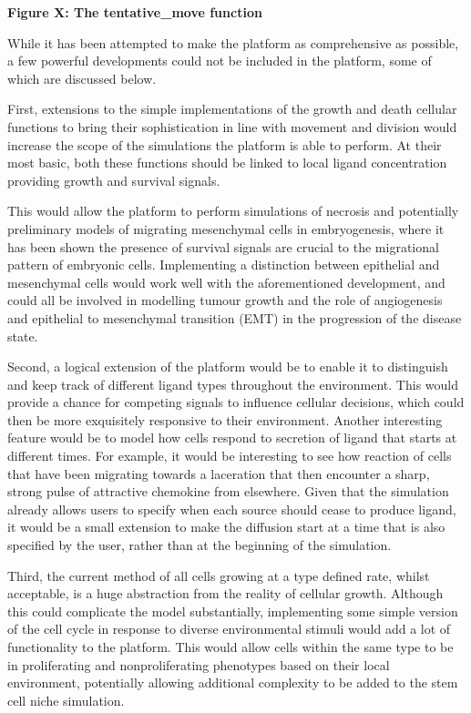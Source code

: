 \documentclass[11.5pt]{article}
\begin{document}
{\bfseries Figure X: The tentative\_move function}



While it has been attempted to make the platform as comprehensive as 
possible, a few powerful developments could not be included in the 
platform, some of which are discussed below. 



First, extensions to the simple implementations of the growth and death 
cellular functions to bring their sophistication in line with movement 
and division would increase the scope of the simulations the platform is 
able to perform. At their most basic, both these functions should be 
linked to local ligand concentration providing growth and survival 
signals. 



This would allow the platform to perform simulations of necrosis and 
potentially preliminary models of migrating mesenchymal cells in 
embryogenesis, where it has been shown the presence of survival signals 
are crucial to the migrational pattern of embryonic cells. Implementing 
a distinction between epithelial and mesenchymal cells would work well 
with the aforementioned development, and could all be involved in 
modelling tumour growth and the role of angiogenesis and epithelial to 
mesenchymal transition (EMT) in the progression of the disease state.



Second, a logical extension of the platform would be to enable it to 
distinguish and keep track of different ligand types throughout the 
environment. This would provide a chance for competing signals to 
influence cellular decisions, which could then be more exquisitely 
responsive to their environment. Another interesting feature would be to 
model how cells respond to secretion of ligand that starts at different 
times. For example, it would be interesting to see how reaction of cells 
that have been migrating towards a laceration that then encounter a 
sharp, strong pulse of attractive chemokine from elsewhere. Given that 
the simulation already allows users to specify when each source should 
cease to produce ligand, it would be a small extension to make the 
diffusion start at a time that is also specified by the user, rather 
than at the beginning of the simulation. 



Third, the current method of all cells growing at a type defined rate, 
whilst acceptable, is a huge abstraction from the reality of cellular 
growth. Although this could complicate the model substantially, 
implementing some simple version of the cell cycle in response to 
diverse environmental stimuli would add a lot of functionality to the 
platform. This would allow cells within the same type to be in 
proliferating and nonproliferating phenotypes based on their local 
environment, potentially allowing additional complexity to be added to 
the stem cell niche simulation.
\end{document}
